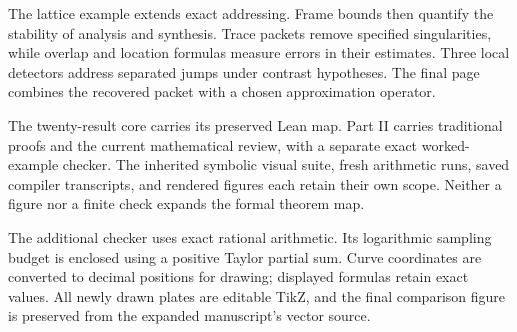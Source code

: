 \documentclass[11pt,a4paper]{article}
\newcommand{\head}[1]{\par\vspace{2pt}{\sffamily\bfseries\normalsize #1}\par\vspace{1pt}}
\begin{document}
\head{A connected route}
The lattice example extends exact addressing. Frame bounds then quantify the
stability of analysis and synthesis. Trace packets remove specified singularities,
while overlap and location formulas measure errors in their estimates. Three
local detectors address separated jumps under contrast hypotheses. The final
page combines the recovered packet with a chosen approximation operator.
\head{Keep the evidence attached to its claim}
The twenty-result core carries its preserved Lean map. Part II carries
traditional proofs and the current mathematical review, with a separate exact
worked-example checker. The inherited symbolic visual suite, fresh arithmetic
runs, saved compiler transcripts, and rendered figures each retain their own
scope. Neither a figure nor a finite check expands the formal theorem map.
\head{What the example numbers mean}
The additional checker uses exact rational arithmetic. Its logarithmic sampling
budget is enclosed using a positive Taylor partial sum. Curve coordinates are
converted to decimal positions for drawing; displayed formulas retain exact
values. All newly drawn plates are editable TikZ, and the final comparison
figure is preserved from the expanded manuscript's vector source.

\clearpage
{}

\end{document}
